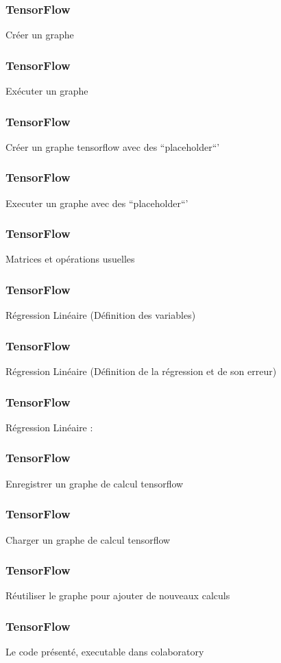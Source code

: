 \begin{frame}
  \frametitle{TensorFlow}
  Créer un graphe
\end{frame}


\begin{frame}
  \frametitle{TensorFlow}
  Exécuter un graphe 
\end{frame}

\begin{frame}
  \frametitle{TensorFlow}
  Créer un graphe tensorflow avec des ``placeholder``'
\end{frame}

\begin{frame}
  \frametitle{TensorFlow}
  Executer un graphe avec des ``placeholder``'
\end{frame}

\begin{frame}
  \frametitle{TensorFlow}
  Matrices et opérations usuelles 
\end{frame}

\begin{frame}
  \frametitle{TensorFlow}
  Régression Linéaire (Définition des variables)
\end{frame}

\begin{frame}
  \frametitle{TensorFlow}
  Régression Linéaire (Définition de la régression et de son erreur) 
\end{frame}

\begin{frame}
  \frametitle{TensorFlow}
  Régression Linéaire :
\end{frame}

\begin{frame}
  \frametitle{TensorFlow}
  Enregistrer un graphe de calcul tensorflow 
\end{frame}

\begin{frame}
  \frametitle{TensorFlow}
  Charger un graphe de calcul tensorflow 
\end{frame}

\begin{frame}
  \frametitle{TensorFlow}
  Réutiliser le graphe pour ajouter de nouveaux calculs 
\end{frame}

\begin{frame}
  \frametitle{TensorFlow}
  {Le code présenté, executable dans colaboratory}
\end{frame}
